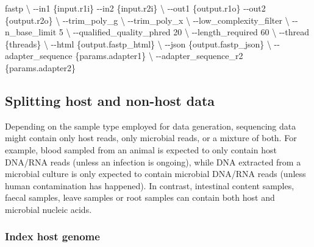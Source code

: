 \documentclass[
]{book}
\newenvironment{Shaded}{\begin{snugshade}}{\end{snugshade}}
\newcommand{\AttributeTok}[1]{\textcolor[rgb]{0.77,0.63,0.00}{#1}}
\newcommand{\DataTypeTok}[1]{\textcolor[rgb]{0.13,0.29,0.53}{#1}}
\newcommand{\ExtensionTok}[1]{#1}
\newcommand{\NormalTok}[1]{#1}
\begin{document}
\begin{Shaded}
\begin{Highlighting}[]
\ExtensionTok{fastp} \DataTypeTok{\textbackslash{}}
    \AttributeTok{{-}{-}in1}\NormalTok{ \{input.r1i\} }\AttributeTok{{-}{-}in2}\NormalTok{ \{input.r2i\} }\DataTypeTok{\textbackslash{}}
    \AttributeTok{{-}{-}out1}\NormalTok{ \{output.r1o\} }\AttributeTok{{-}{-}out2}\NormalTok{ \{output.r2o\} }\DataTypeTok{\textbackslash{}}
    \AttributeTok{{-}{-}trim\_poly\_g} \DataTypeTok{\textbackslash{}}
    \AttributeTok{{-}{-}trim\_poly\_x} \DataTypeTok{\textbackslash{}}
    \AttributeTok{{-}{-}low\_complexity\_filter} \DataTypeTok{\textbackslash{}}
    \AttributeTok{{-}{-}n\_base\_limit}\NormalTok{ 5 }\DataTypeTok{\textbackslash{}}
    \AttributeTok{{-}{-}qualified\_quality\_phred}\NormalTok{ 20 }\DataTypeTok{\textbackslash{}}
    \AttributeTok{{-}{-}length\_required}\NormalTok{ 60 }\DataTypeTok{\textbackslash{}}
    \AttributeTok{{-}{-}thread}\NormalTok{ \{threads\} }\DataTypeTok{\textbackslash{}}
    \AttributeTok{{-}{-}html}\NormalTok{ \{output.fastp\_html\} }\DataTypeTok{\textbackslash{}}
    \AttributeTok{{-}{-}json}\NormalTok{ \{output.fastp\_json\} }\DataTypeTok{\textbackslash{}}
    \AttributeTok{{-}{-}adapter\_sequence}\NormalTok{ \{params.adapter1\} }\DataTypeTok{\textbackslash{}}
    \AttributeTok{{-}{-}adapter\_sequence\_r2}\NormalTok{ \{params.adapter2\}}
\end{Highlighting}
\end{Shaded}

\hypertarget{splitting-host-and-non-host-data}{%
\subsection*{Splitting host and non-host data}\label{splitting-host-and-non-host-data}}

Depending on the sample type employed for data generation, sequencing data might contain only host reads, only microbial reads, or a mixture of both. For example, blood sampled from an animal is expected to only contain host DNA/RNA reads (unless an infection is ongoing), while DNA extracted from a microbial culture is only expected to contain microbial DNA/RNA reads (unless human contamination has happened). In contrast, intestinal content samples, faecal samples, leave samples or root samples can contain both host and microbial nucleic acids.

\hypertarget{index-host-genome}{%
\subsubsection*{Index host genome}\label{index-host-genome}}
\end{document}

